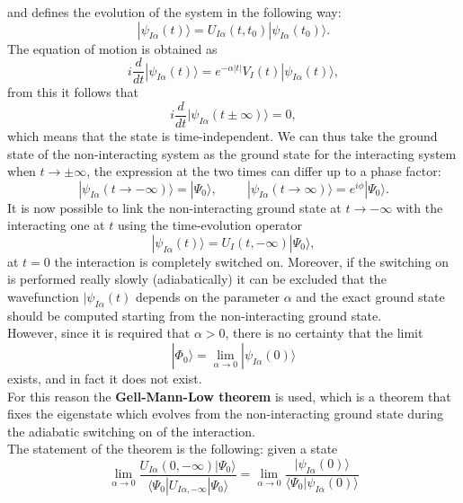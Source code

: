 and defines the evolution of the system in the following way:
\begin{equation}
    |\psi_{I\alpha}(t)\rangle=U_{I\alpha}(t,t_0)|\psi_{I\alpha}(t_0)\rangle.
\end{equation}
The equation of motion is obtained as
\begin{equation}
    i\frac{d}{dt}|\psi_{I\alpha}(t)\rangle = e^{-\alpha |t|} V_I(t)|\psi_{I\alpha}(t)\rangle,
\end{equation}
from this it follows that 
\begin{equation}
    i\frac{d}{dt}|\psi_{I\alpha}(t\pm\infty)\rangle = 0,
\end{equation}
which means that the state is time-independent. We can thus take the ground state of the non-interacting system as the ground state for the 
interacting system when $t\to\pm\infty$, the expression at the two times can differ up to a phase factor:
\begin{equation}
    |\psi_{I\alpha}(t\to-\infty)\rangle=|\Psi_0\rangle,\hspace{1cm}|\psi_{I\alpha}(t\to\infty)\rangle=e^{i\phi}|\Psi_0\rangle.
\end{equation}
It is now possible to link the non-interacting ground state at $t\to-\infty$ with the interacting one at $t$ using the time-evolution 
operator
\begin{equation}
    |\psi_{I\alpha}(t)\rangle=U_I(t,-\infty)|\Psi_0\rangle,
\end{equation}
at $t=0$ the interaction is completely switched on. Moreover, if the switching on is performed really slowly (adiabatically) it can be 
excluded that the wavefunction $|\psi_{I\alpha}(t)$ depends on the parameter $\alpha$ and the exact ground state should be computed starting from 
the non-interacting ground state.\\
However, since it is required that $\alpha>0$, there is no certainty that the limit
\begin{equation}
    |\Phi_0\rangle=\lim_{\alpha\to0}|\psi_{I\alpha}(0)\rangle
\end{equation}
exists, and in fact it does not exist.\\
For this reason the \textbf{Gell-Mann-Low theorem} \cite{PhysRev.84.350} is used, which is a theorem that fixes the eigenstate which evolves from the non-interacting 
ground state during the adiabatic switching on of the interaction.\\
The statement of the theorem is the following: given a state
\begin{equation}
    \lim_{\alpha\to 0}\frac{U_{I\alpha}(0,-\infty)|\Psi_0\rangle}{\langle\Psi_0|U_{I\alpha,-\infty}|\Psi_0\rangle}=\lim_{\alpha\to 0}\frac{|\psi_{I\alpha}(0)\rangle}{\langle\Psi_0|\psi_{I\alpha}(0)\rangle}
\end{equation}
